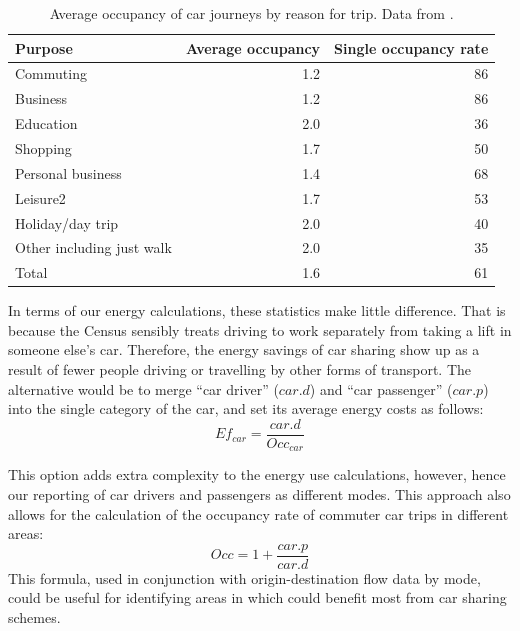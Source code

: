 \documentclass[a4paper, 11pt, twoside]{Thesis}
\begin{document}
\begin{table}[htbp]
\caption[Average occupancy of car journeys by reason for trip]
{Average occupancy of car journeys by reason for trip.
Data from \citet[table 0906]{NationalTravelStatistics2012}.}
\begin{center}
\begin{tabular}{lrr}
\toprule
{Purpose} & Average occupancy & Single occupancy rate \\ \midrule
Commuting & 1.2 & 86 \\
Business & 1.2 & 86 \\
Education & 2.0 & 36 \\
Shopping & 1.7 & 50 \\
Personal business & 1.4 & 68 \\
Leisure2 & 1.7 & 53 \\
Holiday/day trip & 2.0 & 40 \\
Other including just walk & 2.0 & 35 \\
Total & 1.6 & 61 \\
\bottomrule
\end{tabular}\end{center}
\label{toccupancy}
\end{table}

In terms of our energy calculations, these statistics make little difference.
That is because the Census sensibly treats driving to work separately from
taking a lift in someone else's car. Therefore, the energy savings of
car sharing show up as a result of fewer people driving or travelling by
other forms of transport. The alternative would be to merge ``car driver''
($car.d$) and ``car passenger'' ($car.p$) into the single category of
the car, and set its average
energy costs as follows:
\begin{equation}
 Ef_{car} = \frac{car.d}{Occ_{car}}
\end{equation}

This option adds extra complexity to the energy use calculations,
however, hence our reporting of car drivers and passengers as different modes.
This approach also allows for the calculation of the occupancy rate of
commuter car trips in different areas:
\begin{equation}
 Occ = 1 + \frac{car.p}{car.d}
\end{equation}
This formula, used in conjunction with origin-destination flow data by mode,
could be useful for identifying areas in which could benefit most from
car sharing schemes.
\end{document}
